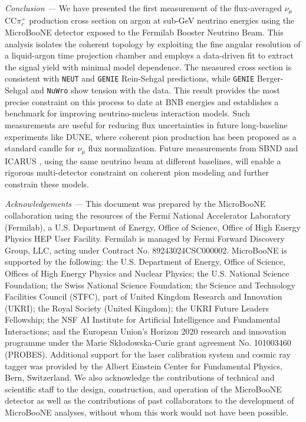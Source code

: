 \documentclass[aps,prl,reprint,superscriptaddress,nofootinbib, showpacs]{revtex4-2}
\begin{document}
\textit{Conclusion ---} We have presented the first measurement of the flux-averaged $\nu_\mu$CC$\pi^+_c$ production cross section on argon at sub-GeV neutrino energies using the MicroBooNE detector exposed to the Fermilab Booster Neutrino Beam.  This analysis isolates the coherent topology by exploiting the fine angular resolution of a liquid-argon time projection chamber and employs a data-driven fit to extract the signal yield with minimal model dependence. The measured cross section is consistent with \texttt{NEUT} and \texttt{GENIE} Rein-Sehgal predictions, while \texttt{GENIE} Berger-Sehgal and \texttt{NuWro} show tension with the data. This result provides the most precise constraint on this process to date at BNB energies and establishes a benchmark for improving neutrino-nucleus interaction models. Such measurements are useful for reducing flux uncertainties in future long-baseline experiments like DUNE, where coherent pion production has been proposed as a standard candle for $\nu_{\mu}$ flux normalization. Future measurements from SBND \cite{SBND} and ICARUS \cite{ICARUS_SBN}, using the same neutrino beam at different baselines, will enable a rigorous multi-detector constraint on coherent pion modeling and further constrain these models.

\textit{Acknowledgements ---} This document was prepared by the MicroBooNE collaboration using the resources of the Fermi National Accelerator Laboratory (Fermilab), a U.S. Department of Energy, Office of Science, Office of High Energy Physics HEP User Facility. Fermilab is managed by Fermi Forward Discovery Group, LLC, acting under Contract No. 89243024CSC000002. MicroBooNE is supported by the
following: 
the U.S. Department of Energy, Office of Science, Offices of High Energy Physics and Nuclear Physics; 
the U.S. National Science Foundation; 
the Swiss National Science Foundation; 
the Science and Technology Facilities Council (STFC), part of United Kingdom Research and Innovation (UKRI);
the Royal Society (United Kingdom);
the UKRI Future Leaders Fellowship;
the NSF AI Institute for Artificial Intelligence and Fundamental Interactions;
and the European Union’s Horizon 2020 research and innovation programme under the Marie Sk\l{}odowska-Curie grant agreement No. 101003460 (PROBES). Additional support for the laser calibration system and cosmic ray tagger was provided by the Albert Einstein Center for Fundamental Physics, Bern, Switzerland. We also acknowledge the contributions of technical and scientific staff to the design, construction, and operation of the MicroBooNE detector as well as the contributions of past collaborators to the development of MicroBooNE analyses, without whom this work would not have been possible.

\end{document}
